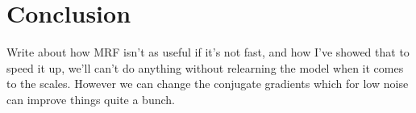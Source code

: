 \documentclass{article}
\begin{document}





\section{Conclusion}

Write about how MRF isn't as useful if it's not fast, and how I've 
showed that to speed it up, we'll can't do anything without relearning 
the model when it comes to the scales. However we can change the 
conjugate gradients which for low noise can improve things quite a 
bunch.

% 

% 

% 

% 

%
%  

% 

\end{document}
